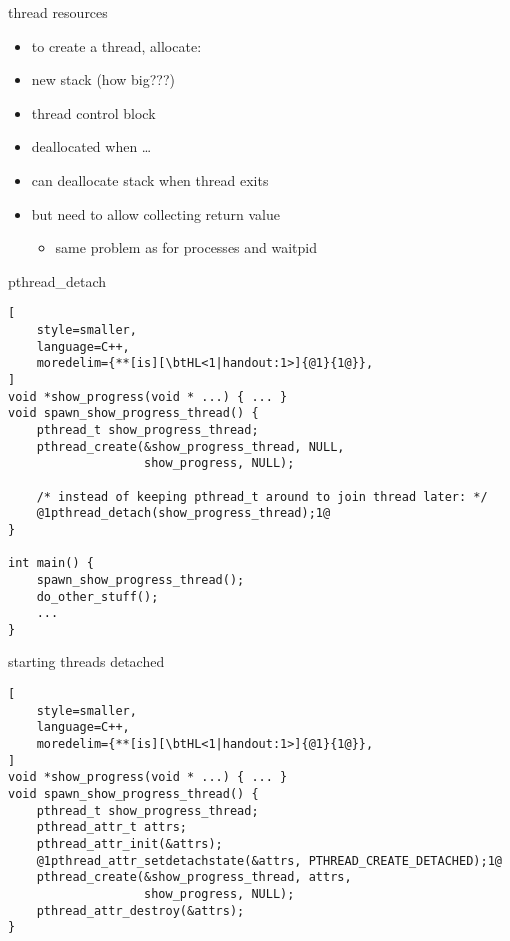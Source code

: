 \begin{frame}{thread resources}
\begin{itemize}
\item to create a thread, allocate:
\item new stack (how big???)
\item thread control block
\vspace{.5cm}
\item deallocated when \ldots
\item<2-> can deallocate stack when thread exits
\item<2-> but need to allow collecting return value
    \begin{itemize}
    \item same problem as for processes and waitpid
    \end{itemize}
\end{itemize}
\end{frame}

\begin{frame}[fragile,label=pthreadDetach]{pthread\_detach}
\begin{lstlisting}[
    style=smaller,
    language=C++,
    moredelim={**[is][\btHL<1|handout:1>]{@1}{1@}},
]
void *show_progress(void * ...) { ... }
void spawn_show_progress_thread() {
    pthread_t show_progress_thread;
    pthread_create(&show_progress_thread, NULL,
                   show_progress, NULL);

    /* instead of keeping pthread_t around to join thread later: */
    @1pthread_detach(show_progress_thread);1@
}

int main() {
    spawn_show_progress_thread();
    do_other_stuff();
    ...
}
\end{lstlisting}
\end{frame}

\begin{frame}[fragile,label=startThreadDetached]{starting threads detached}
\begin{lstlisting}[
    style=smaller,
    language=C++,
    moredelim={**[is][\btHL<1|handout:1>]{@1}{1@}},
]
void *show_progress(void * ...) { ... }
void spawn_show_progress_thread() {
    pthread_t show_progress_thread;
    pthread_attr_t attrs;
    pthread_attr_init(&attrs);
    @1pthread_attr_setdetachstate(&attrs, PTHREAD_CREATE_DETACHED);1@
    pthread_create(&show_progress_thread, attrs,
                   show_progress, NULL);
    pthread_attr_destroy(&attrs);
}
\end{lstlisting}
\end{frame}

